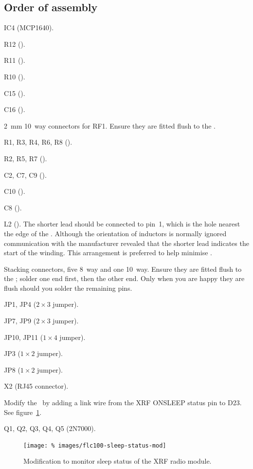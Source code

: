 \subsection{Order of assembly}
\begin{buildorder}
\item IC4 (MCP1640).
\item R12 ().
\item R11 ().
\item R10 ().
\item C15 ().
\item C16 ().
\item \SI{2}{\milli\metre} 10~way connectors for RF1. Ensure they are
  fitted flush to the \pcb.
\item R1, R3, R4, R6, R8 ().
\item R2, R5, R7 ().
\item C2, C7, C9 ().
\item C10 ().
\item C8 ().
\item L2 (). The shorter lead should be connected to pin~1,
  which is the hole nearest the edge of the \pcb. Although the
  orientation of inductors is normally ignored communication with the
  manufacturer revealed that the shorter lead indicates the start of
  the winding. This arrangement is preferred to help minimise \rfi.
\item Stacking connectors, five 8~way and one 10~way. Ensure they are
  fitted flush to the \pcb; solder one end first, then the other
  end. Only when you are happy they are flush should you solder the
  remaining pins.
\item JP1, JP4 ($2 \times 3$ jumper).
\item JP7, JP9 ($2 \times 3$ jumper).
\item JP10, JP11 ($1 \times 4$ jumper).
\item JP3 ($1 \times 2$ jumper).
\item JP8 ($1 \times 2$ jumper).
\item X2 (RJ45 connector).
\item Modify the \pcb\ by adding a link wire from the XRF ONSLEEP
  status pin to D23. See figure~\ref{fig:flc100-sleep-status-mod}.
\item Q1, Q2, Q3, Q4, Q5 (2N7000).
\end{buildorder}

\begin{figure}
  \centering
  \texttt{[image: \%
    images/flc100-sleep-status-mod]}
  \caption[Modification to monitor sleep status of the XRF radio module]{%
    Modification to monitor sleep status of the XRF radio module.
    }
  \label{fig:flc100-sleep-status-mod}
\end{figure}


